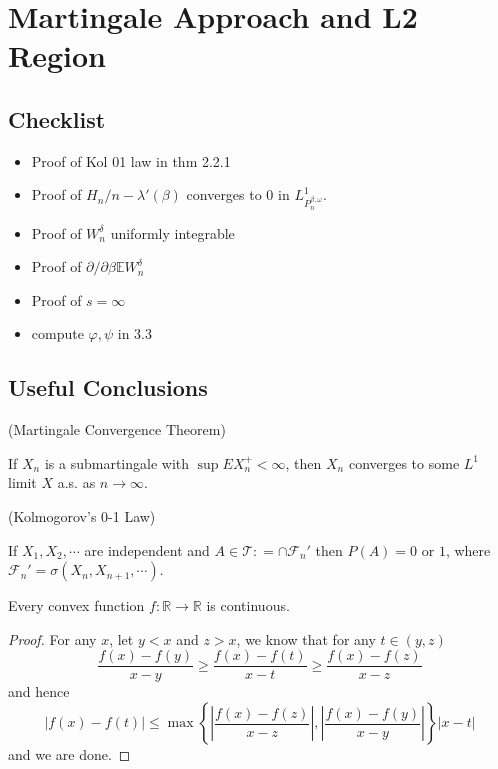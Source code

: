 \section{Martingale Approach and L2 Region}

\subsection{Checklist}

\begin{itemize}
    \item Proof of Kol 01 law in thm 2.2.1
    \item Proof of $H_n/n - \lambda'(\beta)$ converges to 0 in $L^1_{P_n^{\beta,\omega}}$.
    \item Proof of $W_n^{\delta}$ uniformly integrable
    \item Proof of $\partial/\partial \beta \mathbb{E}W_n^{\delta}$
    \item Proof of $s = \infty$
    \item compute $\varphi, \psi$ in 3.3
\end{itemize}

\subsection{Useful Conclusions}

\begin{theorem}
    (Martingale Convergence Theorem)\par
    If $X_n$ is a submartingale with $\sup EX_n^+ < \infty$, then $X_n$ converges to some $L^1$ limit $X$ a.s. as $n\to\infty$.
\end{theorem}

\begin{theorem}
    (Kolmogorov's 0-1 Law)\par
    If $X_1,X_2,\cdots$ are independent and $A \in \mathcal{T}: = \cap \mathcal{F}_n'$ then $P(A) = 0$ or $1$, where $\mathcal{F}_n' = \sigma(X_n, X_{n+1},\cdots)$.
\end{theorem}

\begin{proposition}
    Every convex function $f:\mathbb{R} \to \mathbb{R}$ is continuous. 
\end{proposition}
\begin{proof}
    For any $x$, let $y < x$ and $z >x$, we know that for any $t\in (y,z)$
    \[
    \dfrac{f(x)-f(y)}{x-y} \geq \dfrac{f(x)-f(t)}{x-t} \geq \dfrac{f(x)-f(z)}{x-z}
    \]
    and hence
    \[
    |f(x) - f(t)| \leq \max\left\{\left|\dfrac{f(x)-f(z)}{x-z}\right|,\left|\dfrac{f(x)-f(y)}{x-y}\right|\right\}|x-t|
    \]
    and we are done.
\end{proof}

